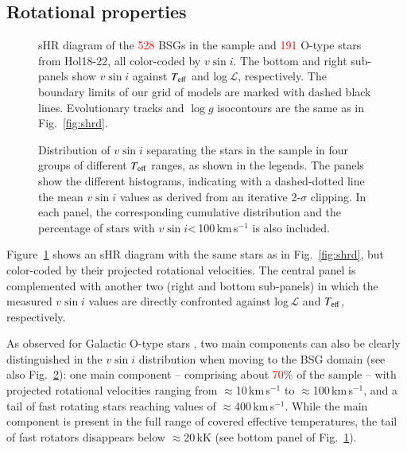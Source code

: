 \documentclass{aa}
\newcommand{\vsini}{\mbox{$v\sin i$}\xspace}
\newcommand{\Teff}{\mbox{$T_{\rm eff}$}\xspace}
\newcommand{\logg}{\mbox{$\log g$}\xspace}
\newcommand{\Ls}{$ \mathcal{L}$\xspace}
\newcommand{\kms}{\,\mbox{km\,s$^{-1}$}\xspace}
\newcommand{\num}[1]{\textcolor{red}{#1}}
\begin{document}


\subsection{Rotational properties}
\label{subsection:52_tmp}

\begin{figure}[!t]
\centering
{}
\caption{sHR diagram of the \num{528} BSGs in the sample and \num{191} O-type stars from Hol18-22, all color-coded by \vsini. The bottom and right sub-panels show \vsini against \Teff and log\,\Ls, respectively. The boundary limits of our grid of models are marked with dashed black lines. Evolutionary tracks and \logg isocontours are the same as in Fig.~\ref{fig:shrd}.}
\label{fig:shrd_vsini}
\end{figure}


\begin{figure}[!t]
\centering
{}
\caption{Distribution of \vsini separating the stars in the sample in four groups of different \Teff ranges, as shown in the legends. The panels show the different histograms, indicating with a dashed-dotted line the mean \vsini values as derived from an iterative 2-$\sigma$ clipping. In each panel, the corresponding cumulative distribution and the percentage of stars with \vsini<\,100\kms is also included.}
\label{fig:hist_vsini}
\end{figure}

Figure~\ref{fig:shrd_vsini} shows an sHR diagram with the same stars as in Fig.~\ref{fig:shrd}, but color-coded by their projected rotational velocities. The central panel is complemented with another two (right and bottom sub-panels) in which the measured \vsini values are directly confronted against log\,\Ls and \Teff, respectively.

As observed for Galactic O-type stars \citep[see][and references therein]{holgado22}, two main components can also be clearly distinguished in the \vsini distribution when moving to the BSG domain (see also Fig.~\ref{fig:hist_vsini}): one main component -- comprising about \num{70}\% of the sample -- with projected rotational velocities ranging from $\approx$10\kms to $\approx$100\kms, and a tail of fast rotating stars reaching values of $\approx$400\kms. While the main component is present in the full range of covered effective temperatures, the tail of fast rotators disappears below $\approx$20\,kK (see bottom panel of Fig.~\ref{fig:shrd_vsini}).
\end{document}
